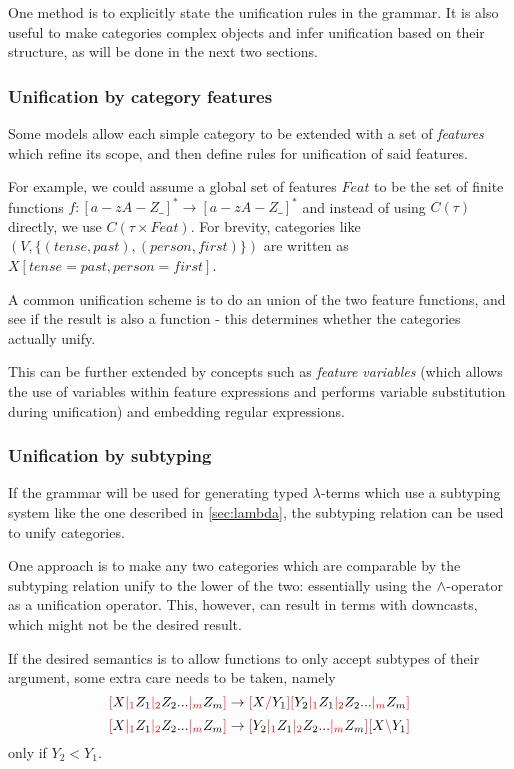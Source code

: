 \documentclass[main.tex]{subfiles}
\begin{document}
One method is to explicitly state the unification rules in the grammar.
It is also useful to make categories complex objects and infer unification
based on their structure, as will be done in the next two sections.

\subsubsection{Unification by category features}
Some models allow each simple category to be extended with a set of \emph{features}
which refine its scope, and then define rules for unification of said features.

For example, we could assume a global set of features $Feat$ to be the
set of finite functions $f: [a-zA-Z\_]^* \rightarrow [a-zA-Z\_]^*$
and instead of using $C(\tau)$ directly, we use $C(\tau \times Feat)$.
For brevity, categories like $(V, \{ (tense, past), (person, first) \})$
are written as $X[tense=past, person=first]$.

A common unification scheme is to do an union of the two feature functions,
and see if the result is also a function - this determines whether the
categories actually unify.

This can be further extended by concepts such as \emph{feature variables}
(which allows the use of variables within feature expressions and
performs variable substitution during unification) and embedding regular expressions.

\subsubsection{Unification by subtyping}
If the grammar will be used for generating typed $\lambda$-terms which use
a subtyping system like the one described in \cref{sec:lambda}, the subtyping
relation can be used to unify categories.

One approach is to make any two categories which are comparable by the subtyping
relation unify to the lower of the two: essentially using the $\wedge$-operator
as a unification operator. This, however, can result in terms with downcasts,
which might not be the desired result.

If the desired semantics is to allow functions to only accept subtypes of
their argument, some extra care needs to be taken, namely
\[ \textcolor{red}{[} X \textcolor{red}{|_{1}} Z_1 \textcolor{red}{|_{2}} Z_2 ... \textcolor{red}{|_{m}} Z_m \textcolor{red}{]} \rightarrow \textcolor{red}{[} X \textcolor{red}{/} Y_1 \textcolor{red}{]} \textcolor{red}{[} Y_2 \textcolor{red}{|_{1}} Z_1 \textcolor{red}{|_{2}} Z_2 ... \textcolor{red}{|_{m}} Z_m \textcolor{red}{]} \]
\[ \textcolor{red}{[} X \textcolor{red}{|_{1}} Z_1 \textcolor{red}{|_{2}} Z_2 ... \textcolor{red}{|_{m}} Z_m \textcolor{red}{]} \rightarrow \textcolor{red}{[} Y_2 \textcolor{red}{|_{1}} Z_1 \textcolor{red}{|_{2}} Z_2 ... \textcolor{red}{|_{m}} Z_m \textcolor{red}{]} \textcolor{red}{[} X \textcolor{red}{\backslash} Y_1 \textcolor{red}{]} \]
only if $Y_2 \less Y_1$.
\end{document}

